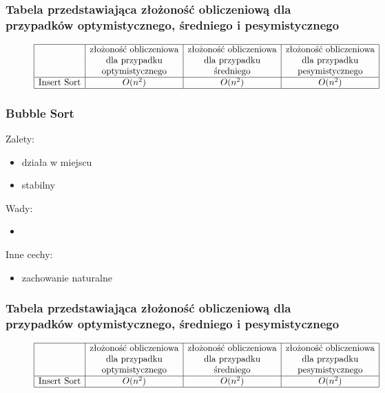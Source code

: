 \documentclass[polish,polish,a4paper]{article}
\begin{document}
\begin{spacing}{1.5}
				\subsubsection*{Tabela przedstawiająca złożoność obliczeniową dla przypadków optymistycznego, średniego i pesymistycznego} 
	\begin{figure}[H]

		\begin{equation*}
		\begin{array}{|l|c|c|c|}
		\hline
		&$złożoność obliczeniowa$&$złożoność obliczeniowa$&$złożoność obliczeniowa$\\
		&$dla przypadku$&$dla przypadku$&$dla przypadku$\\
		&$optymistycznego$&$średniego$&$pesymistycznego$\\
		\hline
		$Insert Sort$&O(n^2)&O(n^2)&O(n^2)\\
		\hline
		\end{array}
		\end{equation*}
	\end{figure}
	
	
			\subsubsection*{Bubble Sort}
	Zalety:
	\begin{itemize}
		\item działa w miejscu
		\item stabilny 
	\end{itemize}
	Wady:
	\begin{itemize}
		\item 
	\end{itemize}
	Inne cechy:
	\begin{itemize}
		\item zachowanie naturalne
	\end{itemize}
	
	
	\subsubsection*{Tabela przedstawiająca złożoność obliczeniową dla przypadków optymistycznego, średniego i pesymistycznego} 
	
	\begin{figure}[H]
			\begin{equation*}
		\begin{array}{|l|c|c|c|}
		\hline
		&$złożoność obliczeniowa$&$złożoność obliczeniowa$&$złożoność obliczeniowa$\\
		&$dla przypadku$&$dla przypadku$&$dla przypadku$\\
		&$optymistycznego$&$średniego$&$pesymistycznego$\\
		\hline
		$Insert Sort$&O(n^2)&O(n^2)&O(n^2)\\
		\hline
		\end{array}
		\end{equation*}
	\end{figure}


\end{spacing}
\end{document}
